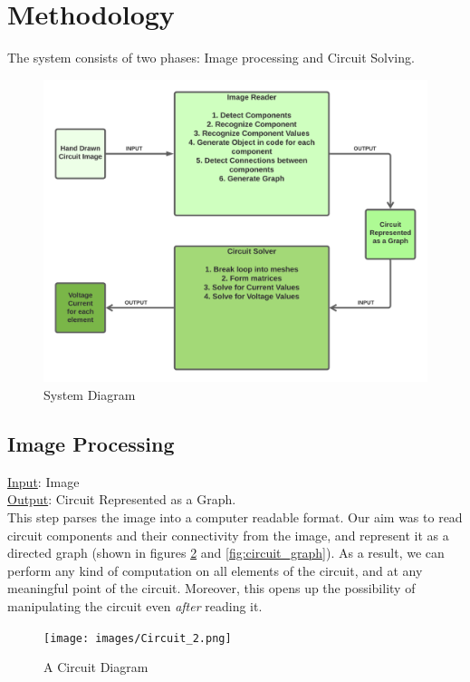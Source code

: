 \documentclass[conference]{IEEEtran}
\begin{document}
\section{\textbf{Methodology}}
    The system consists of two phases: Image processing and Circuit Solving. 
    \begin{figure}[h!]
        \centering
        \includegraphics[scale=0.1]{images/System_Diagram.png}
        \caption{System Diagram}
        \label{fig:my_label}
    \end{figure}

    \subsection{Image Processing}
        \noindent
        \underline{Input}: Image \\
        \underline{Output}: Circuit Represented as a Graph.\\
        This step parses the image into a computer readable format. Our aim was to read circuit components and their connectivity from the image, and represent it as a directed graph (shown in figures \ref{fig:circuit_diagram} and \ref{fig:circuit_graph}). As a result, we can perform any kind of computation on all elements of the circuit, and at any meaningful point of the circuit. Moreover, this opens up the possibility of manipulating the circuit even \textit{after} reading it.    

    \begin{figure}[h!]
        \centering
        \texttt{[image: images/Circuit\_2.png]}
        \caption{A Circuit Diagram}
        \label{fig:circuit_diagram}
    \end{figure}
    
\end{document}
